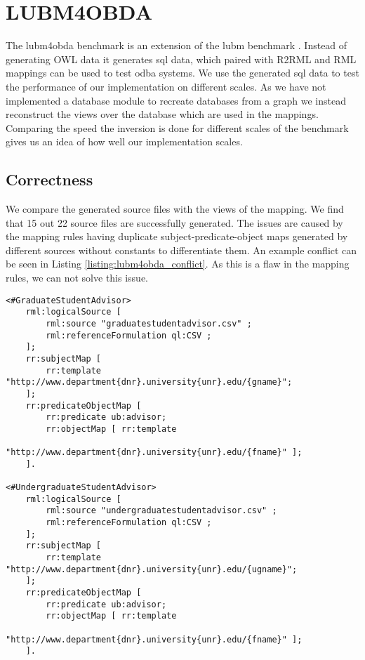 \section{LUBM4OBDA}
\label{section:lubm4obda}
The \acrfull{lubm4obda} benchmark \citep{LUBM4OBDA} is an extension of the \acrfull{lubm} benchmark \citep{LUBM}. Instead of generating OWL data it generates sql data, which paired with R2RML and RML mappings can be used to test \acrshort{odba} systems. We use the generated sql data to test the performance of our implementation on different scales. As we have not implemented a database module to recreate databases from a graph we instead reconstruct the views over the database which are used in the mappings. Comparing the speed the inversion is done for different scales of the benchmark gives us an idea of how well our implementation scales. 

\subsection{Correctness}
We compare the generated source files with the views of the mapping. We find that 15 out 22 source files are successfully generated. The issues are caused by the mapping rules having duplicate subject-predicate-object maps generated by different sources without constants to differentiate them. An example conflict can be seen in Listing \ref{listing:lubm4obda_conflict}. As this is a flaw in the mapping rules, we can not solve this issue.

\begin{lstlisting}[caption={Example of a duplicate mapping pattern in the LUBM4OBDA benchmark}, captionpos=b, label={listing:lubm4obda_conflict}, basicstyle=\small, float=!ht, frame=single]
<#GraduateStudentAdvisor>
    rml:logicalSource [ 
        rml:source "graduatestudentadvisor.csv" ;
        rml:referenceFormulation ql:CSV ;
    ];
    rr:subjectMap [
        rr:template "http://www.department{dnr}.university{unr}.edu/{gname}";
    ];
    rr:predicateObjectMap [
        rr:predicate ub:advisor;
        rr:objectMap [ rr:template 
                "http://www.department{dnr}.university{unr}.edu/{fname}" ];
    ].

<#UndergraduateStudentAdvisor>
    rml:logicalSource [ 
        rml:source "undergraduatestudentadvisor.csv" ;
        rml:referenceFormulation ql:CSV ;
    ];
    rr:subjectMap [
        rr:template "http://www.department{dnr}.university{unr}.edu/{ugname}";
    ];
    rr:predicateObjectMap [
        rr:predicate ub:advisor;
        rr:objectMap [ rr:template 
                "http://www.department{dnr}.university{unr}.edu/{fname}" ];
    ].
\end{lstlisting}

